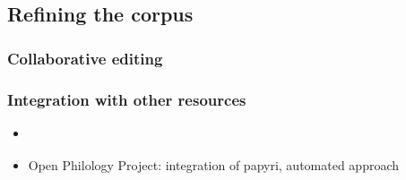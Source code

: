 \subsection{Refining the corpus}
\label{sec:refiningcorpus}

\subsubsection{Collaborative editing}
\label{sec:collaborative}



\subsubsection{Integration with other resources}
\label{sec:linking}
\begin{itemize}
\item \cite{bammanpbml2008,bammantlt8,bammancrane2011}
\item Open Philology Project: integration of papyri, automated approach
\end{itemize}